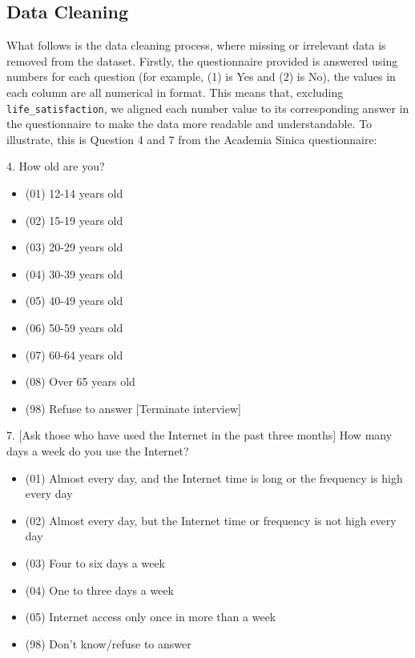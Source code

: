 \documentclass[12pt, a4paper]{article}
\begin{document}
\subsection{Data Cleaning}

\par What follows is the data cleaning process, where missing or irrelevant data is removed from the dataset.
Firstly, the questionnaire provided is answered using numbers for each question (for example, (1) is Yes and (2) is No), the values in each column are all numerical in format.
This means that, excluding \texttt{life\_satisfaction}, we aligned each number value to its corresponding answer in the questionnaire to make the data more readable and understandable.
To illustrate, this is Question 4 and 7 from the Academia Sinica questionnaire:

\bigskip
\footnotesize

\par 4. How old are you?
\begin{itemize}
    \item (01)  12-14  years  old
    \item (02)  15-19  years  old
    \item (03)  20-29  years  old
    \item (04)  30-39  years  old
    \item (05)  40-49  years  old
    \item (06)  50-59  years  old
    \item (07)  60-64  years  old
    \item (08)  Over  65  years  old
    \item (98)  Refuse  to  answer  [Terminate interview]
\end{itemize}

\bigskip

\par \footnotesize 7. [Ask those who have used the Internet in the past three months] How many days a week do you use the Internet?
\begin{itemize}
    \item (01) Almost every day, and the Internet time is long or the frequency is high every day
    \item (02) Almost every day, but the Internet time or frequency is not high every day
    \item (03) Four to six days a week
    \item (04) One to three days a week
    \item (05) Internet access only once in more than a week
    \item (98) Don't know/refuse to answer
\end{itemize}
\end{document}
